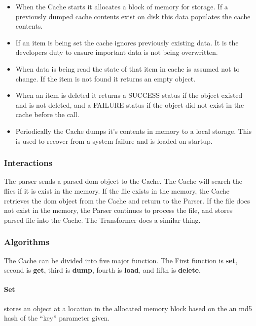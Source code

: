 \begin{itemize}
    \item {
    	When the Cache starts it allocates a block of memory for storage.
        If a previously dumped cache contents exist on disk this data populates the cache contents.
   	}
    \item {
    	If an item is being set the cache ignores previously existing data.
       	It is the developers duty to ensure important data is not being overwritten.
    }
    \item {
    	When data is being read the state of that item in cache is assumed not to change.
        If the item is not found it returns an empty object.
    }
    \item  When an item is deleted it returns a SUCCESS status if the object existed and is not deleted, and a FAILURE status if the object did not exist in the cache before the call.
    \item {
    	Periodically the Cache dumps it's contents in memory to a local storage.
    	This is used to recover from a system failure and is loaded on startup.
    }
\end{itemize}

\subsubsection{Interactions}

The parser sends a parsed \gls{dom} object to the Cache. 
The Cache will search the flies if it is exist in the memory. 
If the file exists in the memory, the Cache retrieves the \gls{dom} object from the Cache and return to the Parser. 
If the file does not exist in the memory, the Parser continues to process the file, and stores parsed file into the Cache.
The Transformer does a similar thing. 

\subsubsection{Algorithms}

The Cache can be divided into five major function.
The First function is \textbf{set}, second is \textbf{get}, third is \textbf{dump}, fourth is \textbf{load}, and fifth is \textbf{delete}.

\paragraph{Set} stores an object at a location in the allocated memory block based on the an \gls{md5} hash of the ``key'' parameter given.

